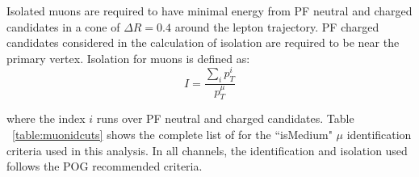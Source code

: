 Isolated muons are required to have minimal energy from PF neutral and charged candidates in a cone of $\Delta R =
0.4$ around the lepton trajectory. PF charged candidates considered in the calculation of isolation are required to be near the 
primary vertex. Isolation for muons is defined as:
\begin{equation}
   I = \frac{\sum_{i} p_{T}^{i}}{p_{T}^{\mu}}
\label{eq:muIso}
\end{equation}

\noindent where the index $i$ runs over PF neutral and charged candidates. Table
~\ref{table:muonidcuts} shows the complete list of for the ``isMedium" $\mu$ identification criteria used in this analysis.
In all channels, the identification and isolation used follows the POG recommended criteria. 

\begin{table}[ht]
 \here
  \caption{$\mu$ Identification}
  \label{table:muonidcuts} %
\end{table}
